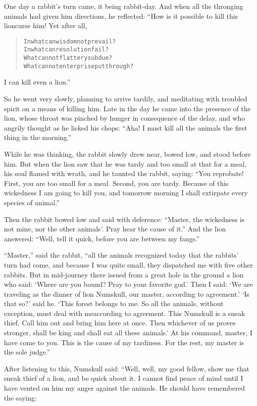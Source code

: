 \documentclass[article, twoside, 14pt]{memoir}
\renewenvironment{verbatim}{%
\begin{quote}%
\vskip -10pt%
\begin{alltt}\normalfont\large}{\end{alltt}%
\end{quote}%
\vskip -10pt
} %
\begin{document}
One day a rabbit's turn came, it being rabbit-day. And when all the
thronging animals had given him directions, he reflected: “How is
it possible to kill this lion{\textemdash}curse him! Yet after all,

\begin{verbatim}
In what can wisdom not prevail?
In what can resolution fail?
What cannot flattery subdue?
What cannot enterprise put through?
\end{verbatim}
I can kill even a lion.”

So he went very slowly, planning to arrive tardily, and meditating
with troubled spirit on a means of killing him. Late in the day he
came into the presence of the lion, whose throat was pinched by
hunger in consequence of the delay, and who angrily thought as he
licked his chops:
``Aha! I must kill all the animals the first thing in the morning.''

While he was thinking, the rabbit slowly drew near, bowed low, and
stood before him. But when the lion saw that he was tardy and too
small at that for a meal, his soul flamed with wrath, and he
taunted the rabbit, saying:
``You reprobate! First, you are too small for a meal. Second, you are tardy. Because of this wickedness I am going to kill you, and tomorrow morning I shall extirpate every species of animal.''

Then the rabbit bowed low and said with deference:
``Master, the wickedness is not mine, nor the other animals'. Pray hear the cause of it.''
And the lion answered:
``Well, tell it quick, before you are between my fangs.''

``Master,'' said the rabbit,
``all the animals recognized today that the rabbits' turn had come, and because I was quite small, they dispatched me with five other rabbits. But in mid-journey there issued from a great hole in the ground a lion who said: `Where are you bound? Pray to your favorite god.' Then I said: `We are traveling as the dinner of lion Numskull, our master, according to agreement.' `Is that so?' said he. `This forest belongs to me. So all the animals, without exception, must deal with me{\textemdash}according to agreement. This Numskull is a sneak thief. Call him out and bring him here at once. Then whichever of us proves stronger, shall be king and shall eat all these animals.' At his command, master, I have come to you. This is the cause of my tardiness. For the rest, my master is the sole judge.''

After listening to this, Numskull said: “Well, well, my good
fellow, show me that sneak thief of a lion, and be quick about it.
I cannot find peace of mind until I have vented on him my anger
against the animals. He should have remembered the saying:
\end{document}
